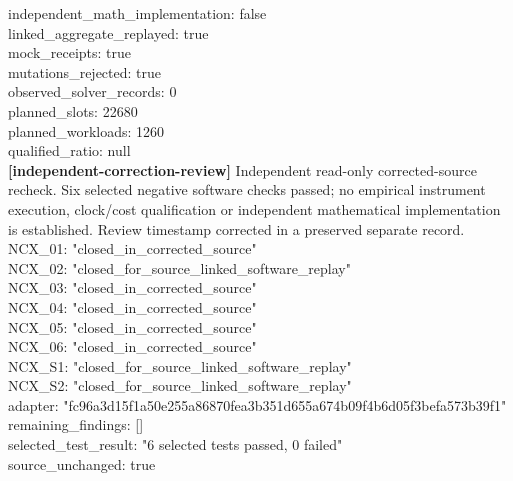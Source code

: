\documentclass[11pt]{article}
\begin{document}
independent\_math\_implementation: false\\
linked\_aggregate\_replayed: true\\
mock\_receipts: true\\
mutations\_rejected: true\\
observed\_solver\_records: 0\\
planned\_slots: 22680\\
planned\_workloads: 1260\\
qualified\_ratio: null\\
\textbf{[independent-correction-review]} Independent read-only corrected-source recheck. Six selected negative software checks passed; no empirical instrument execution, clock/cost qualification or independent mathematical implementation is established. Review timestamp corrected in a preserved separate record.\\
NCX\_01: "closed\_in\_corrected\_source"\\
NCX\_02: "closed\_for\_source\_linked\_software\_replay"\\
NCX\_03: "closed\_in\_corrected\_source"\\
NCX\_04: "closed\_in\_corrected\_source"\\
NCX\_05: "closed\_in\_corrected\_source"\\
NCX\_06: "closed\_in\_corrected\_source"\\
NCX\_S1: "closed\_for\_source\_linked\_software\_replay"\\
NCX\_S2: "closed\_for\_source\_linked\_software\_replay"\\
adapter: "fc96a3d15f1a50e255a86870fea3b351d655a674b09f4b6d05f3befa573b39f1"\\
remaining\_findings: []\\
selected\_test\_result: "6 selected tests passed, 0 failed"\\
source\_unchanged: true\\
\end{document}
